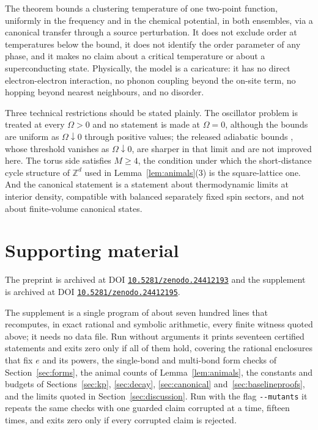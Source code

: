 \documentclass[11pt]{article}
\newcommand{\DOI}[1]{\mbox{\href{https://doi.org/#1}{\nolinkurl{#1}}}}
\newcommand*{\PAPERDOI}{10.5281/zenodo.24412193}
\newcommand*{\SUPPLEMENTDOI}{10.5281/zenodo.24412195}
\theoremstyle{plain}
\theoremstyle{definition}
\begin{document}
The theorem bounds a clustering temperature of one two-point function, uniformly in
the frequency and in the chemical potential, in both ensembles, via a canonical
transfer through a source perturbation. It does not exclude order at temperatures
below the bound, it does not identify the order parameter of any phase, and it makes
no claim about a critical temperature or about a superconducting state. Physically,
the model is a caricature: it has no direct electron-electron interaction, no phonon
coupling beyond the on-site term, no hopping beyond nearest neighbours, and no disorder.

Three technical restrictions should be stated plainly. The oscillator problem is
treated at every $\Omega>0$ and no statement is made at $\Omega=0$, although the
bounds are uniform as $\Omega\downarrow0$ through positive values; the released
adiabatic bounds \cite{rensadiab,slow}, whose threshold vanishes as $\Omega\downarrow0$,
are sharper in that limit and are not improved here. The torus side
satisfies $M\ge4$, the condition under which the short-distance cycle structure of
$\mathbb Z^d$ used in Lemma~\ref{lem:animals}(3) is the square-lattice one. And the
canonical statement is a statement about thermodynamic limits at interior density,
compatible with balanced separately fixed spin sectors, and not about finite-volume
canonical states.

\section{Supporting material}\label{sec:supplement}

The preprint is archived at DOI \DOI{\PAPERDOI} and the supplement is archived at
DOI \DOI{\SUPPLEMENTDOI}.

The supplement is a single program of about seven hundred lines that recomputes, in
exact rational and symbolic arithmetic, every finite witness quoted above; it needs no
data file. Run without arguments it prints seventeen certified statements and exits
zero only if all of them hold, covering the rational enclosures that fix $e$ and its
powers, the single-bond and multi-bond form checks of Section~\ref{sec:forms}, the
animal counts of Lemma~\ref{lem:animals}, the constants and budgets of
Sections~\ref{sec:kp}, \ref{sec:decay}, \ref{sec:canonical}
and~\ref{sec:baselineproofs}, and the limits quoted in Section~\ref{sec:discussion}.
Run with the flag \verb|--mutants| it repeats the same checks with one guarded claim
corrupted at a time, fifteen times, and exits zero only if every corrupted claim is
rejected.
\end{document}
